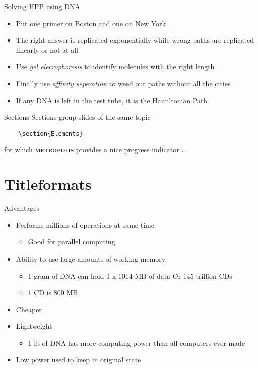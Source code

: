 \documentclass[10pt]{beamer}
\newcommand{\themename}{\textbf{\textsc{metropolis}}\xspace}
\begin{document}
\begin{frame}[fragile]{Solving HPP using DNA}
  \begin{itemize}
        \item Put one primer on Boston and one on New York
    \item The right answer is replicated exponentially while wrong paths are replicated linearly or not at all
         \item Use \textit{gel elecrophoresis} to identify molecules with the right length
         \item Finally use \textit{affinity seperation} to weed out paths without all the cities
         \item If any DNA is left in the test tube, it is the Hamiltonian Path 
  \end{itemize}
\end{frame}

\begin{frame}[fragile]{Sections}
  Sections group slides of the same topic

  \begin{verbatim}    \section{Elements}\end{verbatim}

  for which \themename provides a nice progress indicator \ldots
\end{frame}

\section{Titleformats}

\begin{frame}{Advantages}
  \begin{itemize}
    \item {Performs millions of operations at same time
          \begin{itemize}
        \item{Good for parallel computing}
      \end{itemize}
            }
        \item {Ability to use large amounts of working memory
          \begin{itemize}
        \item{1 gram of DNA can hold 1 x 1014 MB of data Or 145 trillion CDs}
                \item{1 CD is 800 MB}
      \end{itemize}
            }
       
    \item {Cheaper}
        \item {Lightweight
          \begin{itemize}
        \item{1 lb of DNA has more computing power than all computers ever made}
      \end{itemize}
            }
    \item { Low power used to keep in original state}
  \end{itemize}
\end{frame}
\end{document}
